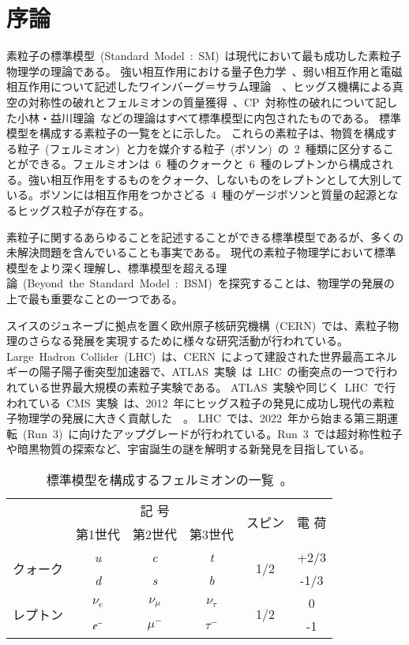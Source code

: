 \chapter{序論}
\thispagestyle{empty}
\label{chap:1}
素粒子の標準模型~(Standard~Model~:~SM)~\cite{URL:10}は現代において最も成功した素粒子物理学の理論である。
強い相互作用における量子色力学~\cite{AR:04}、弱い相互作用と電磁相互作用について記述したワインバーグ＝サラム理論~\cite{AR:05}~\cite{AR:05a}、ヒッグス機構による真空の対称性の破れとフェルミオンの質量獲得~\cite{AR:06}、CP~対称性の破れについて記した小林・益川理論~\cite{AR:07}などの理論はすべて標準模型に内包されたものである。
標準模型を構成する素粒子の一覧をとに示した。
これらの素粒子は、物質を構成する粒子~(フェルミオン)~と力を媒介する粒子~(ボソン)~の~2~種類に区分することができる。フェルミオンは~6~種のクォークと~6~種のレプトンから構成される。強い相互作用をするものをクォーク、しないものをレプトンとして大別している。ボソンには相互作用をつかさどる~4~種のゲージボソンと質量の起源となるヒッグス粒子が存在する。

素粒子に関するあらゆることを記述することができる標準模型であるが、多くの未解決問題を含んでいることも事実である。
現代の素粒子物理学において標準模型をより深く理解し、標準模型を超える理論~(Beyond~the~Standard~Model~:~BSM)~を探究することは、物理学の発展の上で最も重要なことの一つである。

スイスのジュネーブに拠点を置く欧州原子核研究機構~(CERN)~\cite{URL:11}では、素粒子物理のさらなる発展を実現するために様々な研究活動が行われている。Large~Hadron~Collider~(LHC)~\cite{URL:12}は、CERN~によって建設された世界最高エネルギーの陽子陽子衝突型加速器で、ATLAS~実験~\cite{URL:13}は~LHC~の衝突点の一つで行われている世界最大規模の素粒子実験である。
ATLAS~実験や同じく~LHC~で行われている~CMS~実験~\cite{URL:14}は、2012~年にヒッグス粒子の発見に成功し現代の素粒子物理学の発展に大きく貢献した~\cite{TR:03}~\cite{TR:03a}。
LHC~では、2022~年から始まる第三期運転~(Run~3)~に向けたアップグレードが行われている。Run~3~では超対称性粒子や暗黒物質の探索など、宇宙誕生の謎を解明する新発見を目指している。

\begin{table}[htbp]
	\centering
	\begin{tabular}{c|ccc|c|c} \hline
	& \multicolumn{3}{c|}{記 号} & \multirow{2}{*}{スピン} & \multirow{2}{*}{電  荷} \\
	& 第1世代 & 第2世代 & 第3世代 &&  \\ \hline\hline
	\multirow{2}{*}{クォーク} & \it{u} & \it{c} & \it{t} & \multirow{2}{*}{1/2} & +2/3 \\
	& \it{d} & \it{s} & \it{b} &  & -1/3 \\ \hline
	\multirow{2}{*}{レプトン} & $\nu_{e}$ & $\nu_{\mu}$ & $\nu_{\tau}$ & \multirow{2}{*}{1/2} & 0 \\
	& $\it{e}^-$ & $\mu^-$ & $\tau^-$ &  & -1 \\ \hline
	\end{tabular}
	\caption[標準模型を構成するフェルミオンの一覧]{標準模型を構成するフェルミオンの一覧~\cite{URL:10}。}
	\label{tb:SM1}
\end{table}

